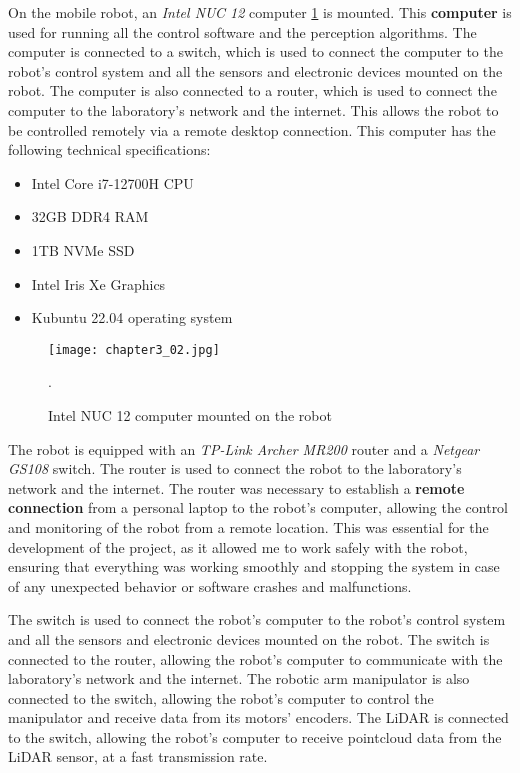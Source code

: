 On the mobile robot, an \textit{Intel NUC 12} computer \ref{fig:c3_img02} is mounted.
This \textbf{computer} is used for running all the control
software and the perception algorithms. The computer is connected to a switch, which is used to connect
the computer to the robot's control system and all the sensors and electronic devices mounted on the robot.
The computer is also connected to a router, which is used to connect the computer to the laboratory's network
and the internet. This allows the robot to be controlled remotely via a remote desktop connection.
This computer has the following technical specifications:

\begin{itemize}
    \item Intel Core i7-12700H CPU
    \item 32GB DDR4 RAM
    \item 1TB NVMe SSD
    \item Intel Iris Xe Graphics
    \item Kubuntu 22.04 operating system
\end{itemize}

\begin{figure}[t]
    \centering
    \texttt{[image: chapter3\_02.jpg]}
    \captionsetup{width=1\linewidth}
    \caption{Intel NUC 12 computer mounted on the robot}.
    \label{fig:c3_img02}
\end{figure}

The robot is equipped with an \textit{TP-Link Archer MR200} router and a \textit{Netgear GS108} switch.
The router is used to connect the robot to the laboratory's network and the internet. The router was necessary to
establish a \textbf{remote connection} from a personal laptop to the robot's computer, allowing the control and monitoring
of the robot from a remote location. This was essential for the development of the project, as it allowed me to
work safely with the robot, ensuring that everything was working smoothly and stopping the system in case of any
unexpected behavior or software crashes and malfunctions.

The switch is used to connect the robot's computer to the robot's control system and all the sensors
and electronic devices mounted on the robot. The switch is connected to the router, allowing the robot's computer
to communicate with the laboratory's network and the internet. The robotic arm manipulator is also connected to the switch,
allowing the robot's computer to control the manipulator and receive data from its motors' encoders. 
The LiDAR is connected to the switch, allowing the robot's computer to receive pointcloud data from the LiDAR sensor,
at a fast transmission rate.
 
